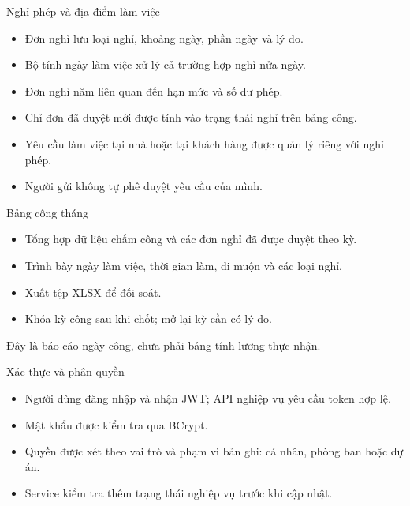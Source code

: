 \documentclass[aspectratio=169,11pt]{beamer}
\begin{document}
\begin{frame}{Nghỉ phép và địa điểm làm việc}
\begin{itemize}
\setlength{\itemsep}{10pt}
\item Đơn nghỉ lưu loại nghỉ, khoảng ngày, phần ngày và lý do.
\item Bộ tính ngày làm việc xử lý cả trường hợp nghỉ nửa ngày.
\item Đơn nghỉ năm liên quan đến hạn mức và số dư phép.
\item Chỉ đơn đã duyệt mới được tính vào trạng thái nghỉ trên bảng công.
\item Yêu cầu làm việc tại nhà hoặc tại khách hàng được quản lý riêng với nghỉ phép.
\item Người gửi không tự phê duyệt yêu cầu của mình.
\end{itemize}
\end{frame}

\begin{frame}{Bảng công tháng}
\begin{itemize}
\setlength{\itemsep}{10pt}
\item Tổng hợp dữ liệu chấm công và các đơn nghỉ đã được duyệt theo kỳ.
\item Trình bày ngày làm việc, thời gian làm, đi muộn và các loại nghỉ.
\item Xuất tệp XLSX để đối soát.
\item Khóa kỳ công sau khi chốt; mở lại kỳ cần có lý do.
\end{itemize}
\vspace{5mm}
\small Đây là báo cáo ngày công, chưa phải bảng tính lương thực nhận.
\end{frame}

\begin{frame}{Xác thực và phân quyền}
\begin{itemize}
\setlength{\itemsep}{10pt}
\item Người dùng đăng nhập và nhận JWT; API nghiệp vụ yêu cầu token hợp lệ.
\item Mật khẩu được kiểm tra qua BCrypt.
\item Quyền được xét theo vai trò và phạm vi bản ghi: cá nhân, phòng ban hoặc dự án.
\item Service kiểm tra thêm trạng thái nghiệp vụ trước khi cập nhật.
\end{itemize}
\end{frame}
\end{document}
